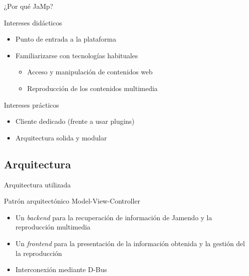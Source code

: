 \documentclass{beamer}
\begin{document}
\begin{frame}{¿Por qué JaMp?}
\begin{block}{Intereses didácticos}
\begin{itemize}
  \item Punto de entrada a la plataforma
  \item Familiarizarse con tecnologías habituales
  \begin{itemize}
    \item Acceso y manipulación de contenidos web
    \item Reproducción de los contenidos multimedia
  \end{itemize}
\end{itemize}
\end{block}
\begin{block}{Intereses prácticos}
\begin{itemize}
  \item Cliente dedicado (frente a usar plugins)
  \item Arquitectura solida y modular
\end{itemize}
\end{block}
\end{frame}

\subsection{Arquitectura}

\begin{frame}{Arquitectura utilizada}
\begin{center}
\end{center}

%
%

\begin{block}{Patrón arquitectónico Model-View-Controller}
\begin{itemize}
  \item Un {\it backend} para la recuperación de información de Jamendo y la
  reproducción multimedia
  \item Un {\it frontend} para la presentación de la información obtenida y la
  gestión del la reproducción
  \item Interconexión mediante D-Bus
\end{itemize}
\end{block}
\end{frame}
\end{document}
